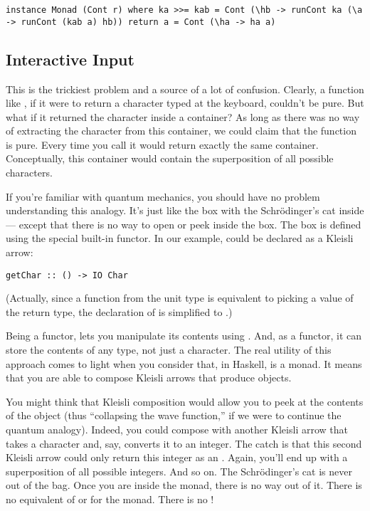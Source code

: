 \begin{verbatim}
instance Monad (Cont r) where ka >>= kab = Cont (\hb -> runCont ka (\a -> runCont (kab a) hb)) return a = Cont (\ha -> ha a)
\end{verbatim}

\subsection{Interactive Input}\label{interactive-input}

This is the trickiest problem and a source of a lot of confusion.
Clearly, a function like , if it were to return a
character typed at the keyboard, couldn't be pure. But what if it
returned the character inside a container? As long as there was no way
of extracting the character from this container, we could claim that the
function is pure. Every time you call  it would return
exactly the same container. Conceptually, this container would contain
the superposition of all possible characters.

If you're familiar with quantum mechanics, you should have no problem
understanding this analogy. It's just like the box with the
Schrödinger's cat inside --- except that there is no way to open or peek
inside the box. The box is defined using the special built-in
 functor. In our example,  could be declared
as a Kleisli arrow:

\begin{verbatim}
getChar :: () -> IO Char
\end{verbatim}

(Actually, since a function from the unit type is equivalent to picking
a value of the return type, the declaration of  is
simplified to .)

Being a functor,  lets you manipulate its contents using
. And, as a functor, it can store the contents of any type,
not just a character. The real utility of this approach comes to light
when you consider that, in Haskell,  is a monad. It means
that you are able to compose Kleisli arrows that produce 
objects.

You might think that Kleisli composition would allow you to peek at the
contents of the  object (thus ``collapsing the wave
function,'' if we were to continue the quantum analogy). Indeed, you
could compose  with another Kleisli arrow that takes a
character and, say, converts it to an integer. The catch is that this
second Kleisli arrow could only return this integer as an
. Again, you'll end up with a superposition of all
possible integers. And so on. The Schrödinger's cat is never out of the
bag. Once you are inside the  monad, there is no way out of
it. There is no equivalent of  or 
for the  monad. There is no !

